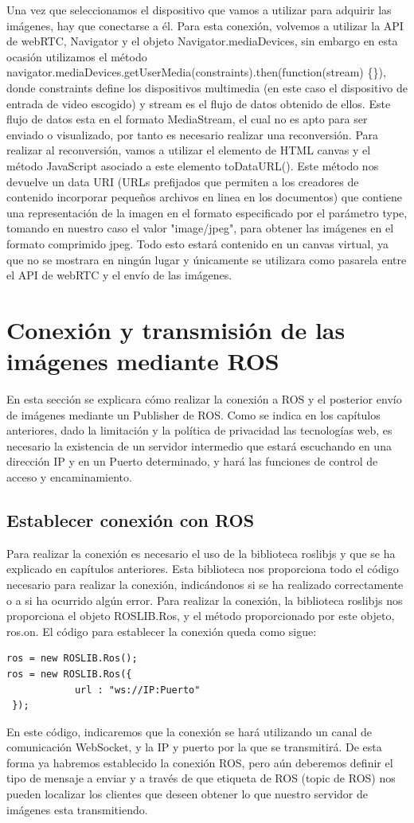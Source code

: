 Una vez que seleccionamos el dispositivo que vamos a utilizar para adquirir las imágenes, hay que conectarse a él. Para esta conexión, volvemos a utilizar la API de webRTC, Navigator y el objeto Navigator.mediaDevices, sin embargo en esta ocasión utilizamos el método navigator.mediaDevices.getUserMedia(constraints).then(function(stream) \{\}), donde constraints define los dispositivos multimedia (en este caso el dispositivo de entrada de video escogido) y stream es el flujo de datos obtenido de ellos.
Este flujo de datos esta en el formato MediaStream, el cual no es apto para ser enviado o visualizado, por tanto es necesario realizar una reconversión. Para realizar al reconversión, vamos a utilizar el elemento de HTML canvas y el método JavaScript asociado a este elemento toDataURL(). Este método nos devuelve un data URI (URLs prefijados que permiten a los creadores de contenido incorporar pequeños archivos en linea en los documentos) que contiene una representación de la imagen en el formato especificado por el parámetro type, tomando en nuestro caso el valor "image/jpeg", para obtener las imágenes en el formato comprimido jpeg. Todo esto estará contenido en un canvas virtual, ya que no se mostrara en ningún lugar y únicamente se utilizara como pasarela entre el API de webRTC y el envío de las imágenes.

\section{Conexión y transmisión de las imágenes mediante ROS}
En esta sección se explicara cómo realizar la  conexión a ROS y el posterior envío de imágenes mediante un Publisher de ROS. Como se indica en los capítulos anteriores, dado la limitación y la política de privacidad las tecnologías web, es necesario la existencia de un servidor intermedio que estará escuchando en una dirección IP y en un Puerto determinado, y hará las funciones de control de acceso y encaminamiento.

\subsection{Establecer conexión con ROS}
Para realizar la conexión es necesario el uso de la biblioteca roslibjs y que se ha explicado en capítulos anteriores. Esta biblioteca nos proporciona todo el código necesario para realizar la conexión, indicándonos si se ha realizado correctamente o a si ha ocurrido algún error. Para realizar la conexión, la biblioteca roslibjs nos proporciona el objeto ROSLIB.Ros, y el método proporcionado por este objeto, ros.on. El código para establecer la conexión queda como sigue:
\begin{lstlisting}[frame=single]
ros = new ROSLIB.Ros();
ros = new ROSLIB.Ros({
            url : "ws://IP:Puerto"
 });
\end{lstlisting}
En este código, indicaremos que la conexión se hará utilizando un canal de comunicación WebSocket, y la IP y puerto por la que se transmitirá. De esta forma ya habremos establecido la conexión ROS, pero aún deberemos definir el tipo de mensaje a enviar y a través de que etiqueta de ROS (topic de ROS) nos pueden localizar los clientes que deseen obtener lo que nuestro servidor de imágenes esta transmitiendo.

